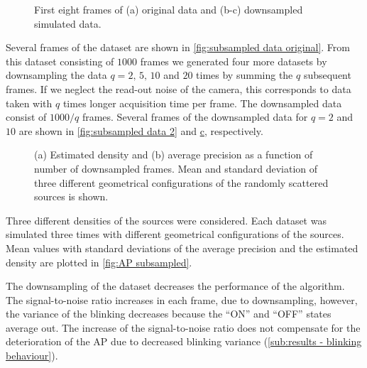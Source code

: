 \begin{figure}[!htb]	
	\newcommand{\widthfig}{1\textwidth}
	\centering	
	
	
	
	\caption{First eight frames of (a) original data and (b-c) downsampled simulated data. }
	\label{fig:subsampled data}
\end{figure} 
%
Several frames of the dataset are shown in \autoref{fig:subsampled data original}. From this dataset consisting of $1000$ frames we generated four more datasets by downsampling the data $q=2,\,5,\,10$ and $20$ times by summing the $q$ subsequent frames. If  we neglect the read-out noise of the camera, this corresponds to data taken with $q$ times longer acquisition time per frame. The downsampled data consist of $1000/q$ frames. Several frames of the downsampled data for $q=2$ and $10$ are shown in \autoref{fig:subsampled data 2} and \hyperref[fig:subsampled data 10]{c}, respectively. 
%
\begin{figure}[!htb]	
	\newcommand{\wf}{.45\textwidth}
	\newcommand{\sizef}{.38}
	\centering
	\caption{(a) Estimated density and (b) average precision as a function of number of downsampled frames. Mean and standard deviation of three different geometrical configurations of the randomly scattered sources is shown.}
	\label{fig:AP subsampled}
\end{figure}

Three different densities of the sources were considered. Each dataset was simulated three times   with different geometrical configurations of the sources. Mean values with standard deviations of the average precision and the estimated density are plotted in \autoref{fig:AP subsampled}. 

The downsampling of the dataset decreases the performance of the \inmf{} algorithm. The signal-to-noise ratio increases in each frame, due to downsampling, however, the variance of the blinking decreases because the ``ON'' and ``OFF'' states average out. The increase of the signal-to-noise ratio does not compensate for the deterioration of the AP due to decreased blinking variance (\autoref{sub:results - blinking behaviour}). 

